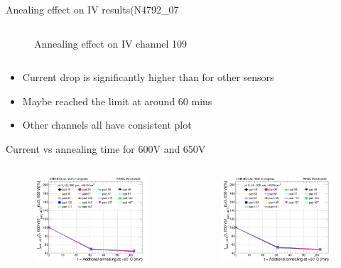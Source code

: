 \documentclass{beamer}
\begin{document}
\begin{frame}{Anealing effect on IV results(N4792\_07 }
\begin{columns}
\begin{figure}
           \caption{Annealing effect on IV channel 109}
       \end{figure}
   \end{columns}
   \begin{itemize}
    \item Current drop is significantly higher than for other sensors
      \item Maybe reached the limit at around 60 mins
      \item Other channels all have consistent plot
   \end{itemize}
\end{frame}

\begin{frame}{Current vs annealing time for 600V and 650V}
  \begin{columns}
       \begin{figure}
           \includegraphics[width=1.0\textwidth]{plots/8in_198ch_2019_N4792_7_neg40degC_annealing_current_600.png}
       \end{figure}
       \begin{figure}
           \includegraphics[width=1.0\textwidth]{plots/8in_198ch_2019_N4792_7_neg40degC_annealing_current_650.png}

\end{figure}
\end{columns}
\end{frame}
\end{document}
